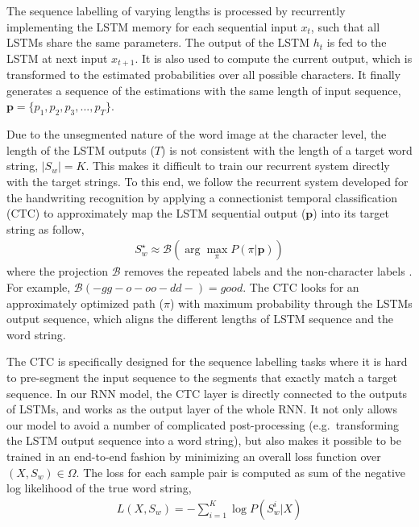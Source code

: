 \documentclass[letterpaper]{article}
\begin{document}
The sequence labelling of varying lengths is processed by recurrently implementing the LSTM memory for each sequential input $x_t$, such that all LSTMs share the same parameters. The output of the LSTM $h_t$ is fed to the LSTM at next input $x_{t+1}$. It is also used to compute the current output, which is transformed to the estimated probabilities over all possible characters. It finally generates a sequence of the estimations with the same length of input sequence, $\textbf{p}=\{p_1,p_2,p_3,...,p_T\}$.


Due to the unsegmented nature of the word image at the character level, the length of the LSTM outputs ($T$) is not consistent with the length of a target word string, $|S_w|=K$. This makes it difficult to train our recurrent system directly with the target strings. To this end, we follow the recurrent system developed for the handwriting recognition \cite{Graves2009} by applying a connectionist temporal classification (CTC) \cite{Graves2005} to approximately map the LSTM sequential output ($\textbf{p}$) into its target string as follow,
\begin{eqnarray}
S_w^\star\approx\mathcal{B}(\arg\max_\pi P(\pi|\textbf{p}))
\end{eqnarray}
where the projection $\mathcal{B}$ removes the repeated labels and the non-character labels \cite{Graves2005}. For example, $\mathcal{B}(-gg-o-oo-dd-)=good$. The CTC looks for an approximately optimized path ($\pi$) with maximum probability through the LSTMs output sequence, which aligns the different lengths of LSTM sequence and the word string.



The CTC is specifically designed for the sequence labelling tasks where it is hard to  pre-segment the input sequence to the segments that exactly match a target sequence. In our RNN model, the CTC layer is directly connected to the outputs of LSTMs, and works as the output layer of the whole RNN. It not only allows our model to avoid a number of complicated post-processing (e.g.\ transforming the LSTM output sequence into a word string), but also makes it possible to be trained in an end-to-end fashion by minimizing an overall loss function over $(X,S_w)\in\Omega$. The loss for each sample pair is computed as sum of the negative log likelihood of the true word string,
\begin{eqnarray}
L(X,S_w)=-\sum_{i=1}^K \log P(S_w^i|X)
\end{eqnarray}
\end{document}

